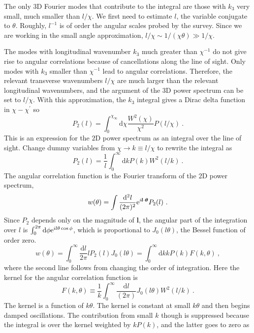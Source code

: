 \documentclass[12pt,a4paper]{article}
\renewcommand{\vec}[1]{\boldsymbol{#1}}
\newcommand{\dif}{\mathrm{d}}
\begin{document}
The only $3$D Fourier modes that contribute to the integral are those with $k_3$ very small, much smaller than $l/\chi$. We first need to estimate $l$, the variable conjugate to $\theta$. Roughly, $l^{-1}$ is of order the angular scales probed by the survey. Since we are working in the small angle approximation, $l/\chi \sim 1/(\chi \theta) \gg 1/\chi$. 
 

The modes with longitudinal wavenumber $k_3$ much greater than $\chi^{-1}$ do not give rise to angular correlations because of cancellations along the line of sight. Only modes with $k_3$ smaller than $\chi^{-1}$ lead to angular correlations. Therefore, the 
relevant transverse wavenumbers $l/\chi$ are much larger than the relevant longitudinal wavenumbers, and the argument of the $3$D power spectrum can be set to $l/\chi$. With this approximation, the $k_3$ integral gives a Dirac delta function in $\chi - \chi^\prime$ so
\begin{equation}
P_2(l) = \int_0^{\chi_{\infty}} \dif \chi \dfrac{W^2(\chi)}{\chi^2} P(l/\chi) ~.
\end{equation}
This is an expression for the $2$D power spectrum as an integral over the line of sight. Change dummy variables from $\chi \rightarrow k \equiv l/\chi$ to rewrite the integral as 
\begin{equation}
P_2(l) = \dfrac{1}{l} \int_0^\infty \dif k P(k) W^2(l/k) ~.
\end{equation}
The angular correlation function is the Fourier transform of the $2$D power spectrum, 
\begin{equation}
w(\theta) = \int \dfrac{\dif^2 l}{(2\pi)^2} {\rm e}^{i\vec{l}\cdot \vec{\theta}} P_2(l) ~.
\end{equation}
Since $P_2$ depends only on the magnitude of $\vec{l}$, the angular part of the integration over $l$ is $\int_0^{2\pi} \dif \phi {\rm e}^{il\theta \cos \phi}$, which is proportional to $J_0(l\theta)$, the Bessel function of order zero.
\begin{equation}
w(\theta) = \int_0^\infty \dfrac{\dif l}{2\pi} l P_2(l) J_0(l \theta) = \int_0^\infty \dif k k P(k) F(k, \theta) ~,
\end{equation}
where the second line follows from changing the order of integration. Here the kernel for the angular correlation function is 
\begin{equation}
F(k, \theta) \equiv \dfrac{1}{k} \int_0^\infty \dfrac{\dif l}{(2\pi)} J_0(l\theta) W^2(l/k) ~.
\end{equation}
The kernel is a function of $k \theta$. The kernel is constant at small $k \theta$ and then begins damped oscillations. The contribution from small $k$ though is suppressed because the integral is over the kernel weighted by $kP(k)$, and the latter goes to zero as 
\end{document}
